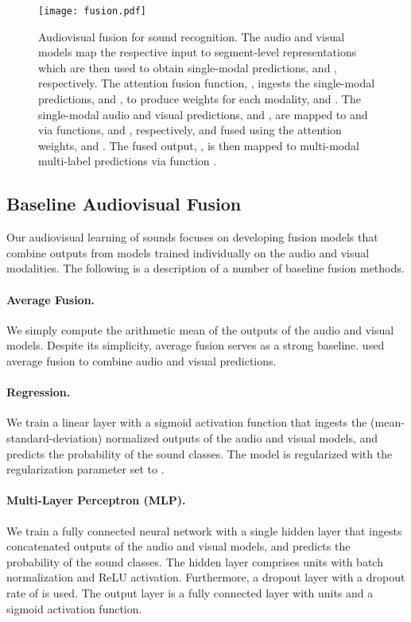 \documentclass{article}
\begin{document}
\begin{figure*}[t]
	\centering
	\texttt{[image: fusion.pdf]}
	\caption{Audiovisual fusion for sound recognition.
		The audio and visual models map the respective input to segment-level representations which are  then used to obtain single-modal predictions,  and , respectively.
		The attention fusion function, , ingests the single-modal predictions,  and , to produce weights for each modality,  and .
		The single-modal audio and visual predictions,  and , are mapped to  and  via functions,  and , respectively, and fused using the attention weights,  and .
		The fused output, , is then mapped to multi-modal multi-label predictions via function .}\label{fig:fusion}
\end{figure*}

\subsection{Baseline Audiovisual Fusion}\label{ssec:sfusion}

Our audiovisual learning of sounds focuses on developing fusion models that combine outputs from models trained individually on the audio and visual modalities.
The following is a description of a number of baseline fusion methods.

\paragraph{Average Fusion.}
We simply compute the arithmetic mean of the outputs of the audio and visual models.
Despite its simplicity, average fusion serves as a strong baseline.
\cite{parekh2019weakly} used average fusion to combine audio and visual predictions.

\paragraph{Regression.}
We train a linear layer with a sigmoid activation function that ingests the (mean-standard-deviation) normalized outputs of the audio and visual models, and predicts the probability of the sound classes.
The model is  regularized with the regularization parameter set to .

\paragraph{Multi-Layer Perceptron (MLP).}
We train a fully connected neural network with a single hidden layer that ingests concatenated outputs of the audio and visual models, and predicts the probability of the sound classes.
The hidden layer comprises  units with batch normalization and ReLU activation.
Furthermore, a dropout layer with a dropout rate of  is used.
The output layer is a fully connected layer with  units and a sigmoid activation function.
\end{document}

